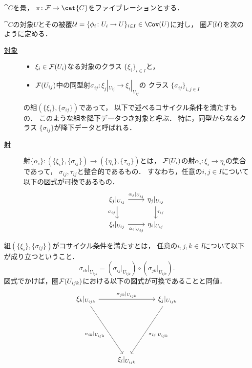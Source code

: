     \begin{Def}
    $\cat{C}$を景，
    $\pi \colon \stF \to \cat{C}$をファイブレーションとする．

    $\cat{C}$の対象$U$とその被覆$\covU=\{\phi_i \colon U_i \to U\}_{i \in I} \in \Cov(U)$に対し，
    圏$\mathcal{F}(\mathcal{U})$を次のように定める．
    \begin{description}
        \item[\underline{対象}] \hfill \vspace{-0.2cm}
            \begin{itemize}
                \item $\xi_i \in \mathcal{F}(U_i)$なる対象のクラス $\{\xi_i\}_{i \in I}$と，
                \item
                    $\mathcal{F}(U_{ij})$中の同型射$\sigma_{ij} \colon \xi_j|_{U_{ij}} \to \xi_i|_{U_{ij}}$の
                    クラス $\{\sigma_{ij}\}_{i,j \in I}$
            \end{itemize}
            の組$(\{\xi_i\}, \{\sigma_{ij}\})$であって，
            以下で述べるコサイクル条件を満たすもの．
            このような組を降下データつき対象と呼ぶ．
            特に，同型からなるクラス $\{\sigma_{ij}\}$が降下データと呼ばれる．

        \item[\underline{射}] \mnewline
            射$\{\alpha_i\} \colon (\{\xi_i\}, \{\sigma_{ij}\}) \to (\{\eta_i\}, \{\tau_{ij}\})$とは，
            $\mathcal{F}(U_i)$の射$\alpha_i \colon \xi_i \to \eta_i$の集合であって，\mnewline
            $\sigma_{ij}, \tau_{ij}$と整合的であるもの．
            すなわち，任意の$i, j \in I$について以下の図式が可換であるもの．
            \[
            \begin{tikzcd}
                \xi_j|_{U_{ij}} \ar[d, "\sigma_{ij}"'] \ar[r, "\alpha_j|_{U_{ij}}"]& \eta_j|_{U_{ij}} \ar[d, "\tau_{ij}"]\\
                \xi_i|_{U_{ij}} \ar[r, "\alpha_i|_{U_{ij}}"']& \eta_i|_{U_{ij}}
            \end{tikzcd}
            \]
    \end{description}

    組$(\{\xi_i\}, \{\sigma_{ij}\})$がコサイクル条件を満たすとは，
    任意の$i,j,k \in I$について以下が成り立つということ．
    \[ \sigma_{ik}|_{U_{ijk}}=(\sigma_{ij}|_{U_{ijk}}) \circ (\sigma_{jk}|_{U_{ijk}}). \]
    図式でかけば，圏$\mathcal{F}(U_{ijk})$における以下の図式が可換であることと同値．
    \[
    \begin{tikzcd}[row sep=70pt]
        \xi_k|_{U_{ijk}} \ar[rd, "\sigma_{ik}|_{U_{ijk}}"'] \ar[rr, "\sigma_{jk}|_{U_{ijk}}"]
            & {}
            & \xi_j|_{U_{ijk}} \ar[ld, "\sigma_{ij}|_{U_{ijk}}"] \\
        {} & \xi_i|_{U_{ijk}} & {}
    \end{tikzcd}
    \]
    \end{Def}

